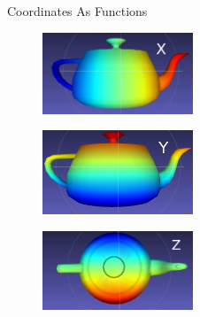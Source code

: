\documentclass{beamer}
\begin{document}
\begin{frame}{Coordinates As Functions}

\begin{figure}[t]
    \includegraphics[width=0.4\textwidth]{TeapotX.png}
\end{figure}

\begin{figure}[t]
    \includegraphics[width=0.4\textwidth]{TeapotY.png}
\end{figure}

\begin{figure}[t]
    \includegraphics[width=0.4\textwidth]{TeapotZ.png}
\end{figure}
\end{frame}
\end{document}
